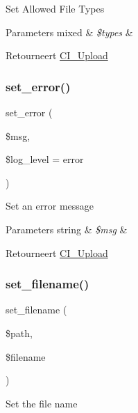 Set Allowed File Types


\begin{DoxyParams}[1]{Parameters}
mixed & {\em \$types} & \\
\hline
\end{DoxyParams}
\begin{DoxyReturn}{Retourneert}
\mbox{\hyperlink{class_c_i___upload}{C\+I\+\_\+\+Upload}} 
\end{DoxyReturn}
\mbox{\label{class_c_i___upload_aab6e33df2ad916fc21e93a84b6fd48bf}} 
\subsubsection{\texorpdfstring{set\_error()}{set\_error()}}
{\footnotesize\ttfamily set\+\_\+error (\begin{DoxyParamCaption}\item[{}]{\$msg,  }\item[{}]{\$log\+\_\+level = {\ttfamily \textquotesingle{}error\textquotesingle{}} }\end{DoxyParamCaption})}

Set an error message


\begin{DoxyParams}[1]{Parameters}
string & {\em \$msg} & \\
\hline
\end{DoxyParams}
\begin{DoxyReturn}{Retourneert}
\mbox{\hyperlink{class_c_i___upload}{C\+I\+\_\+\+Upload}} 
\end{DoxyReturn}
\mbox{\label{class_c_i___upload_a4b09b3f2b57a8bafcac1700f43d12c36}} 
\subsubsection{\texorpdfstring{set\_filename()}{set\_filename()}}
{\footnotesize\ttfamily set\+\_\+filename (\begin{DoxyParamCaption}\item[{}]{\$path,  }\item[{}]{\$filename }\end{DoxyParamCaption})}

Set the file name

